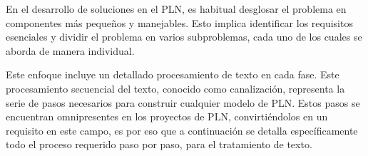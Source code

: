 En el desarrollo de soluciones en el PLN, es habitual desglosar el problema en componentes más pequeños y manejables. Esto implica identificar los requisitos esenciales y dividir el problema en varios subproblemas, cada uno de los cuales se aborda de manera individual.

Este enfoque incluye un detallado procesamiento de texto en cada fase. Este procesamiento secuencial del texto, conocido como canalización, representa la serie de pasos necesarios para construir cualquier modelo de PLN. Estos pasos se encuentran omnipresentes en los proyectos de PLN, convirtiéndolos en un requisito en este campo, es por eso que a continuación se detalla específicamente todo el proceso requerido paso por paso, para el tratamiento de texto.
